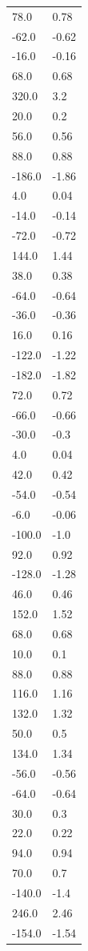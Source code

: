 \begin{longtable}{ll}
78.0 & 0.78 \\
-62.0 & -0.62 \\
-16.0 & -0.16 \\
68.0 & 0.68 \\
320.0 & 3.2 \\
20.0 & 0.2 \\
56.0 & 0.56 \\
88.0 & 0.88 \\
-186.0 & -1.86 \\
4.0 & 0.04 \\
-14.0 & -0.14 \\
-72.0 & -0.72 \\
144.0 & 1.44 \\
38.0 & 0.38 \\
-64.0 & -0.64 \\
-36.0 & -0.36 \\
16.0 & 0.16 \\
-122.0 & -1.22 \\
-182.0 & -1.82 \\
72.0 & 0.72 \\
-66.0 & -0.66 \\
-30.0 & -0.3 \\
4.0 & 0.04 \\
42.0 & 0.42 \\
-54.0 & -0.54 \\
-6.0 & -0.06 \\
-100.0 & -1.0 \\
92.0 & 0.92 \\
-128.0 & -1.28 \\
46.0 & 0.46 \\
152.0 & 1.52 \\
68.0 & 0.68 \\
10.0 & 0.1 \\
88.0 & 0.88 \\
116.0 & 1.16 \\
132.0 & 1.32 \\
50.0 & 0.5 \\
134.0 & 1.34 \\
-56.0 & -0.56 \\
-64.0 & -0.64 \\
30.0 & 0.3 \\
22.0 & 0.22 \\
94.0 & 0.94 \\
70.0 & 0.7 \\
-140.0 & -1.4 \\
246.0 & 2.46 \\
-154.0 & -1.54 \\

\end{longtable}
